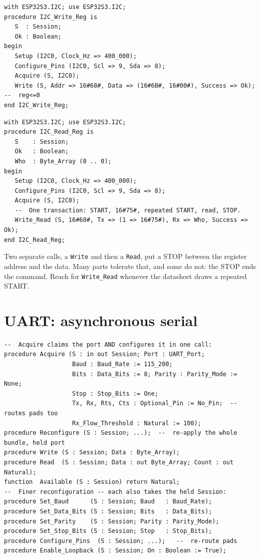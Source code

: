 \begin{lstlisting}
with ESP32S3.I2C; use ESP32S3.I2C;
procedure I2C_Write_Reg is
   S  : Session;
   Ok : Boolean;
begin
   Setup (I2C0, Clock_Hz => 400_000);
   Configure_Pins (I2C0, Scl => 9, Sda => 8);
   Acquire (S, I2C0);
   Write (S, Addr => 16#68#, Data => (16#6B#, 16#00#), Success => Ok);  --  reg<=0
end I2C_Write_Reg;
\end{lstlisting}

\begin{lstlisting}
with ESP32S3.I2C; use ESP32S3.I2C;
procedure I2C_Read_Reg is
   S    : Session;
   Ok   : Boolean;
   Who  : Byte_Array (0 .. 0);
begin
   Setup (I2C0, Clock_Hz => 400_000);
   Configure_Pins (I2C0, Scl => 9, Sda => 8);
   Acquire (S, I2C0);
   --  One transaction: START, 16#75#, repeated START, read, STOP.
   Write_Read (S, 16#68#, Tx => (1 => 16#75#), Rx => Who, Success => Ok);
end I2C_Read_Reg;
\end{lstlisting}

\noindent Two separate calls, a \texttt{Write} and then a \texttt{Read}, put a
STOP between the register address and the data. Many parts tolerate that, and
some do not: the STOP ends the command. Reach for \texttt{Write\_Read} whenever
the datasheet draws a repeated START.

\section{UART: asynchronous serial}

\begin{lstlisting}
--  Acquire claims the port AND configures it in one call:
procedure Acquire (S : in out Session; Port : UART_Port;
                   Baud : Baud_Rate := 115_200;
                   Bits : Data_Bits := 8; Parity : Parity_Mode := None;
                   Stop : Stop_Bits := One;
                   Tx, Rx, Rts, Cts : Optional_Pin := No_Pin;  --  routes pads too
                   Rx_Flow_Threshold : Natural := 100);
procedure Reconfigure (S : Session; ...);  --  re-apply the whole bundle, held port
procedure Write (S : Session; Data : Byte_Array);
procedure Read  (S : Session; Data : out Byte_Array; Count : out Natural);
function  Available (S : Session) return Natural;
--  Finer reconfiguration -- each also takes the held Session:
procedure Set_Baud      (S : Session; Baud   : Baud_Rate);
procedure Set_Data_Bits (S : Session; Bits   : Data_Bits);
procedure Set_Parity    (S : Session; Parity : Parity_Mode);
procedure Set_Stop_Bits (S : Session; Stop   : Stop_Bits);
procedure Configure_Pins  (S : Session; ...);   --  re-route pads
procedure Enable_Loopback (S : Session; On : Boolean := True);
\end{lstlisting}

